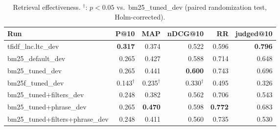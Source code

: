 \begin{table}[t]
\centering
\begin{tabular}{lrrrrr}
\toprule
Run & P@10 & MAP & nDCG@10 & RR & judged@10 \\
\midrule
tfidf\_lnc.ltc\_dev & \textbf{0.317} & 0.374 & 0.522 & 0.596 & \textbf{0.796} \\
bm25\_default\_dev & 0.265 & 0.427 & 0.588 & 0.714 & 0.648 \\
bm25\_tuned\_dev & 0.265 & 0.441 & \textbf{0.600} & 0.743 & 0.696 \\
bm25f\_tuned\_dev & 0.143$^\dagger$ & 0.235$^\dagger$ & 0.330$^\dagger$ & 0.495 & 0.326 \\
bm25\_tuned+filters\_dev & 0.248 & 0.382 & 0.562 & 0.706 & 0.543 \\
bm25\_tuned+phrase\_dev & 0.265 & \textbf{0.470} & 0.598 & \textbf{0.772} & 0.683 \\
bm25\_tuned+filters+phrase\_dev & 0.248 & 0.411 & 0.560 & 0.735 & 0.530 \\
\bottomrule
\end{tabular}
\caption{Retrieval effectiveness. $^\dagger$: $p<0.05$ vs.\ bm25\_tuned\_dev (paired randomization test, Holm-corrected).}
\end{table}
